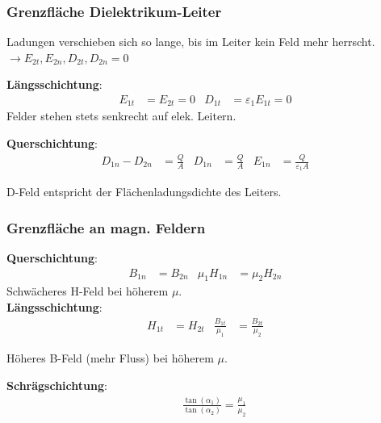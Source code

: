 	\subsubsection{Grenzfläche Dielektrikum-Leiter}
		Ladungen verschieben sich so lange, bis im Leiter kein Feld mehr herrscht.
		$\rightarrow E_{2t}, E_{2n}, D_{2t}, D_{2n} = 0 $

		\vspace{0.5em}
		\textbf{Längsschichtung}:
		\begin{align*}
			E_{1t} & = E_{2t} = 0 & D_{1t} & =\varepsilon_1 E_{1t} = 0 &
		\end{align*}
		Felder stehen stets senkrecht auf elek. Leitern.

		\vspace{0.5em}
		\textbf{Querschichtung}:
		\begin{align*}
			D_{1n} - D_{2n} & = \frac{Q}{A} & D_{1n} & = \frac{Q}{A} & E_{1n} & = \frac{Q}{\varepsilon_1 A} &
		\end{align*}

		D-Feld entspricht der Flächenladungsdichte des Leiters.

	\subsubsection{Grenzfläche an magn. Feldern}
		\textbf{Querschichtung}:
		\begin{align*}
			B_{1n} & = B_{2n} & \mu_1 H_{1n} & =\mu_2 H_{2n} &
		\end{align*}
		Schwächeres H-Feld bei höherem $ \mu $.\\

		\textbf{Längsschichtung}:
		\begin{align*}
			H_{1t} & = H_{2t} & \frac{B_{1t}}{\mu_1} & = \frac{B_{2t}}{\mu_2} &
		\end{align*}

		Höheres B-Feld (mehr Fluss) bei höherem $ \mu $.

		\vspace{0.5em}
		\textbf{Schrägschichtung}:
		\begin{align*}
			& \frac{\tan( \alpha_1)}{\tan( \alpha_2)} = \frac{ \mu_1}{\mu_2}
		\end{align*}
